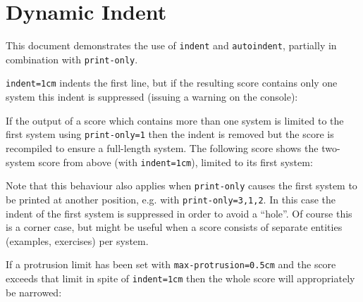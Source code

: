\documentclass{lyluatexexample}
\begin{document}
\section*{Dynamic Indent}

This document demonstrates the use of \texttt{indent} and \texttt{autoindent},
partially in combination with \texttt{print-only}.

\texttt{indent=1cm} indents the first line, but if the resulting score contains
only one system this indent is suppressed (issuing a warning on the console):



If the output of a score which contains more than one system is limited to the
first system using \texttt{print-only=1} then the indent is removed but the
score is recompiled to ensure a full-length system. The following score shows
the two-system score from above (with \texttt{indent=1cm}), limited to its first
system:


Note that this behaviour also applies when \texttt{print-only} causes the first
system to be printed at another position, e.g. with \texttt{print-only={3,1,2}}.
In this case the indent of the first system is suppressed in order to avoid a
“hole”. Of course this is a corner case, but might be useful when a score
consists of separate entities (examples, exercises) per system.


If a protrusion limit has been set with \texttt{max-protrusion=0.5cm} and the
score exceeds that limit in spite of \texttt{indent=1cm} then the whole score
will appropriately be narrowed:

\end{document}
